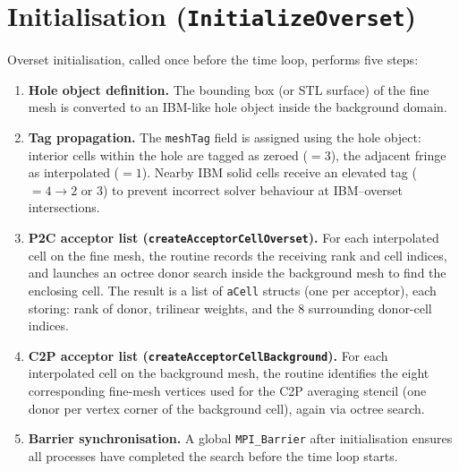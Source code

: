 \documentclass[12pt,a4paper]{article}
\begin{document}
\section{Initialisation (\texttt{InitializeOverset})}
\label{sec:overset-init}

Overset initialisation, called once before the time loop, performs five
steps:

\begin{enumerate}
  \item \textbf{Hole object definition.}
        The bounding box (or STL surface) of the fine
        mesh is converted to an IBM-like hole object inside the
        background domain.

  \item \textbf{Tag propagation.}
        The \texttt{meshTag} field is assigned using the hole object:
        interior cells within the hole are tagged as zeroed ($= 3$),
        the adjacent fringe as interpolated ($= 1$).
        Nearby IBM solid cells receive an elevated tag ($= 4 \to 2$ or $3$)
        to prevent incorrect solver behaviour at IBM--overset intersections.

  \item \textbf{P2C acceptor list (\texttt{createAcceptorCellOverset}).}
        For each interpolated cell on the fine mesh, the routine records
        the receiving rank and cell indices, and launches an octree
        donor search inside the background mesh to find the
        enclosing cell.  The result is a list of
        \texttt{aCell} structs (one per acceptor), each storing:
        rank of donor, trilinear weights, and the 8 surrounding
        donor-cell indices.

  \item \textbf{C2P acceptor list (\texttt{createAcceptorCellBackground}).}
        For each interpolated cell on the background mesh, the routine
        identifies the eight corresponding fine-mesh vertices used for the
        C2P averaging stencil (one donor per vertex corner of the
        background cell), again via octree search.

  \item \textbf{Barrier synchronisation.}
        A global \texttt{MPI\_Barrier} after initialisation ensures all
        processes have completed the search before the time loop starts.
\end{enumerate}
\end{document}
